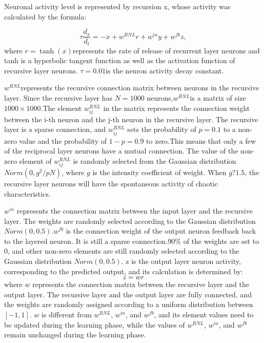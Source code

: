 \documentclass[runningheads]{llncs}
\begin{document}
Neuronal activity level is represented by recursion x, 
whose activity was calculated by the formula:

\begin{equation}
\tau \frac{d_x}{d_t}=-x+w^{RNL}r+w^{in}y+w^{fb}z,
\end{equation}
where $r = \tanh(x)$represents the rate of release 
of recurrent layer neurons and tanh is a hyperbolic 
tangent function as well as the activation function of 
recursive layer neurons. $\tau=0.01$is the neuron activity
 decay constant.

$w^{RNL}$represents the recursive connection matrix between 
neurons in the recursive layer.
Since the recursive layer has $N=1000$ neurons,$w^{RNL}$is a 
matrix of size $1000\times1000$.The element $w_{ij}^{RNL}$
in the matrix represents the connection weight between 
the i-th neuron and the j-th neuron in the recursive layer.
The recursive layer is a sparse connection, and $w_{ij}^{RNL}$
sets the probability of $p=0.1$ to a non-zero value and the 
probability of $1-p=0.9$ to zero.This means that only a few 
of the reciprocal layer neurons have a mutual connection. 
The value of the non-zero element of $w_{ij}^{RNL}$ 
is randomly selected from the Gaussian distribution $Norm(0,g^{2}/pN)$,
where $g$ is the intensity coefficient of weight.
When $g?1.5$, the recursive layer neurons will have the 
spontaneous activity of chaotic characteristics\cite{RN17}.

$w^{in}$ represents the connection matrix between the 
input layer and the recursive layer.
The weights are randomly selected according to the 
Gaussian distribution $Norm(0, 0.5)$.$w^{fb}$ is the connection 
weight of the output neuron feedback back to the layered neuron. 
It is still a sparse connection.90$\%$ of the weights are set to 0, 
and other non-zero elements are still randomly selected according 
to the Gaussian distribution $Norm(0,0.5)$.
z is the output layer neuron activity, corresponding to 
the predicted output, and its calculation is determined by:
\begin{equation}
z=wr
\end{equation}
where $w$ represents the connection matrix between the recursive layer 
and the output layer. The recursive layer and the output layer are 
fully connected, and the weights are randomly assigned according 
to a uniform distribution between $\left[-1,1\right]$. 
$w$ is different from $w^{RNL}$, $w^{in}$, and $w^{fb}$, and
its element values need to be updated during the learning phase,
 while the values of $w^{RNL}$, $w^{in}$, and $w^{fb}$ remain unchanged during 
 the learning phase.
\end{document}
